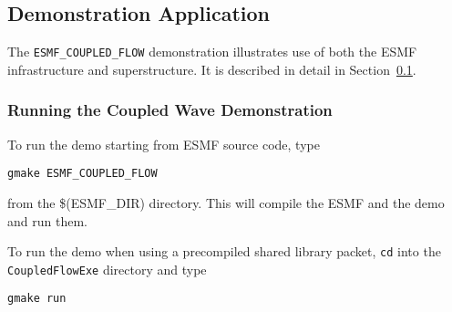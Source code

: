 \subsection{Demonstration Application}
\label{sec:demo}

The {\tt ESMF\_COUPLED\_FLOW} demonstration illustrates use of both the
ESMF infrastructure and superstructure.  It is described in detail in 
Section~\ref{sec:demo}.

\subsubsection{Running the Coupled Wave Demonstration}

To run the demo starting from ESMF source code, type 

\begin{verbatim}
gmake ESMF_COUPLED_FLOW
\end{verbatim}

from the \$(ESMF_DIR) directory.  This will compile the 
ESMF and the demo and run them.

To run the demo when using a precompiled shared
library packet, {\tt cd} into the {\tt CoupledFlowExe}
directory and type

\begin{verbatim}
gmake run
\end{verbatim}






























